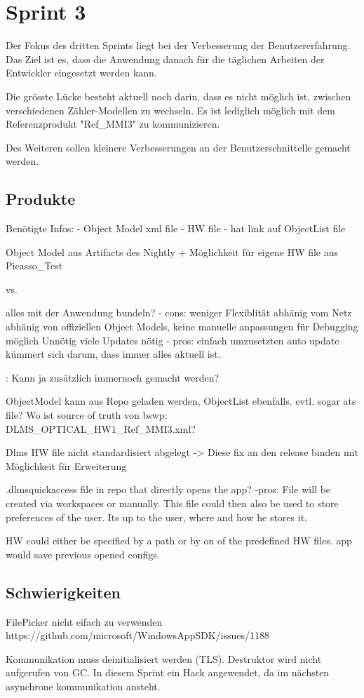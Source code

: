 \section{Sprint 3}
Der Fokus des dritten Sprints liegt bei der Verbesserung der Benutzererfahrung.
Das Ziel ist es, dass die Anwendung danach für die täglichen Arbeiten der Entwickler eingesetzt werden kann.

Die grösste Lücke besteht aktuell noch darin, dass es nicht möglich ist, zwischen verschiedenen Zähler-Modellen zu wechseln.
Es ist lediglich möglich mit dem Referenzprodukt "Ref\_MMI3" zu kommunizieren.

Des Weiteren sollen kleinere Verbesserungen an der Benutzerschnittelle gemacht werden.


\subsection{Produkte}
Benötigte Infos:
- Object Model xml file
- HW file
   - hat link auf ObjectList file

Object Model aus Artifacts des Nightly
+ Möglichkeit für eigene
HW file aus Picasso\_Test

vs.

alles mit der Anwendung bundeln?
- cons:
weniger Flexiblität
abhänig vom Netz
abhänig von offiziellen Object Models, keine manuelle anpassungen für Debugging möglich
Unnötig viele Updates nötig
- pros:
einfach umzusetzten
auto update kümmert sich darum, dass immer alles aktuell ist.

: Kann ja zusätzlich immernoch gemacht werden?


ObjectModel kann aus Repo geladen werden, ObjectList ebenfalls.
evtl. sogar ats file?
Wo ist source of truth von bswp: DLMS\_OPTICAL\_HW1\_Ref\_MMI3.xml?


Dlms HW file nicht standardisiert abgelegt
-> Diese fix an den release binden mit Möglichkeit für Erweiterung

.dlmsquickaccess file in repo that directly opens the app?
-pros:
File will be created via workspaces or manually.
This file could then also be used to store preferences of the user. Its up to the user, where and how he stores it.

HW could either be specified by a path or by on of the predefined HW files.
app would save previous opened configs.



\subsection{Schwierigkeiten}
FilePicker nicht eifach zu verwenden
https://github.com/microsoft/WindowsAppSDK/issues/1188

Kommunikation muss deinitialisiert werden (TLS). Destruktor wird nicht aufgerufen von GC. 
In diesem Sprint ein Hack angewendet, da im nächsten asynchrone kommunikation ansteht.